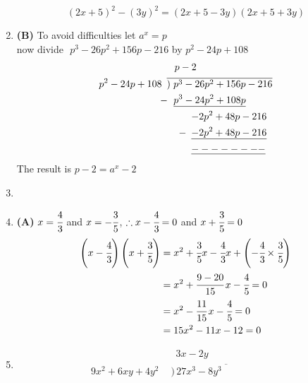 \begin{multicols}{2}
\begin{enumerate}[label={\textbf{\arabic*.}}]
\begin{align*}
    \end{align*}
    $$(2x+5)^2 - (3y)^2 = (2x+ 5 - 3y)(2x + 5 + 3y)$$
    \item \textbf{(B)} To avoid difficulties let $a^x = p$ \\
    now divide\,\, $p^3 - 26p^2 + 156p - 216$ by $p^2 - 24p + 108$ 
    \begin{align*} 
        & \hspace{8pt} p -2 \\
        p^2 - 24p + 108 \hspace{5pt} & \overline{)\hspace{3pt} p^3 - 26p^2 + 156p - 216} \\
       -\hspace{-1pt} & \hspace{7pt} \underline{p^3 - 24p^2 + 108p} \\
       & \hspace{25pt} {-2p^2 + 48p -216}\\
      -\hspace{-20pt} & \hspace{25pt} \underline{-2p^2 + 48p -216} \\
      & \hspace{25pt} \underline{--------}
    \end{align*}
    The result is $p-2 = a^x - 2$
    \item
    \item \textbf{(A)} $x = \cfrac{4}{3}$ and $x = -\cfrac{3}{5}$, \hspace{5pt} $\therefore  x-\cfrac{4}{3} = 0$ and $x+\cfrac{3}{5} = 0$ 
    \begin{align*}
    \left(x-\cfrac{4}{3}\right)\left(x+\cfrac{3}{5}\right) &= x^2 + \cfrac{3}{5}x - \cfrac{4}{3}x + \left(-\cfrac{4}{3} \times \cfrac{3}{5}\right) \\
    & = x^2  +  \cfrac{9 - 20}{15}\,x -\cfrac{4}{5} = 0 \\
    & = x^2 - \cfrac{11}{15}\,x -\cfrac{4}{5} = 0 \\
    & = 15x^2 - 11x - 12 = 0
    \end{align*}
    \item 
    \begin{align*}
        &\hspace{6pt} 3x - 2y \\
      9x^2 + 6xy + 4y^2 \hspace{5pt}  & \overline{)\hspace{2pt} 27x^3 - 8y^3 \hspace{1in}} \\

\end{align*}
\end{enumerate}
\end{multicols}
